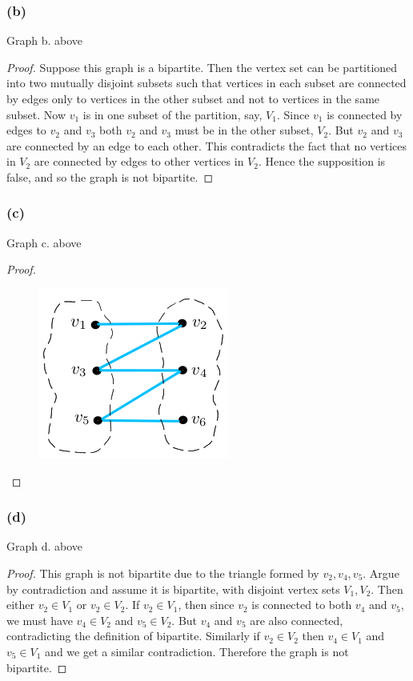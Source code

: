 \documentclass[14pt]{extarticle}
\begin{document}
\subsubsection{(b)}
Graph b. above

\begin{proof}
Suppose this graph is a bipartite. Then the vertex set can be partitioned into two mutually disjoint subsets such that vertices in each subset are connected by edges only to vertices in the other subset and not to vertices in the same subset. Now $v_1$ is in one subset of the partition, say, $V_1$. Since $v_1$ is connected by edges to $v_2$ and $v_3$ both $v_2$ and $v_3$ must be in the other subset, $V_2$. But $v_2$ and $v_3$ are connected by an edge to each other. This contradicts the fact that no vertices in $V_2$ are connected by edges to other vertices in $V_2$. Hence the supposition is false, and so the graph is not bipartite.
\end{proof}

\subsubsection{(c)}
Graph c. above

\begin{proof}
\begin{figure}[ht!]
\centering
\includegraphics[scale=0.4]{../images/4.9.24.c.png}
\end{figure}
\end{proof}

\subsubsection{(d)}
Graph d. above

\begin{proof}
This graph is not bipartite due to the triangle formed by $v_2, v_4, v_5$. Argue by contradiction and assume it is bipartite, with disjoint vertex sets $V_1, V_2$. Then either $v_2 \in V_1$ or $v_2 \in V_2$. If $v_2 \in V_1$, then since $v_2$ is connected to both $v_4$ and $v_5$, we must have $v_4 \in V_2$ and $v_5 \in V_2$. But $v_4$ and $v_5$ are also connected, contradicting the definition of bipartite. Similarly if $v_2 \in V_2$ then $v_4 \in V_1$ and $v_5 \in V_1$ and we get a similar contradiction. Therefore the graph is not bipartite.
\end{proof}
\end{document}
